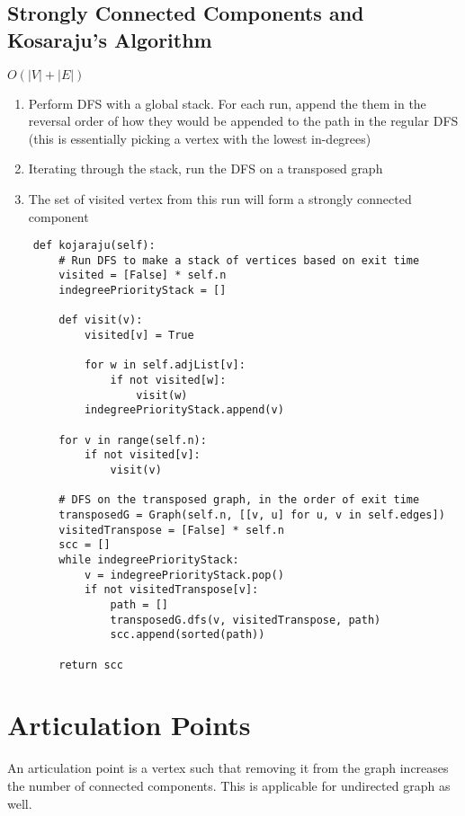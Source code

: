 \subsection{Strongly Connected Components and Kosaraju's Algorithm}

$O(|V| + |E|)$

\begin{enumerate}
  \item Perform DFS with a global stack. For each run, append the them in the reversal order of how they would be appended to the path in the regular DFS (this is essentially picking a vertex with the lowest in-degrees)
  \item Iterating through the stack, run the DFS on a transposed graph
  \item The set of visited vertex from this run will form a strongly connected component
\end{enumerate}

\begin{verbatim}
    def kojaraju(self):
        # Run DFS to make a stack of vertices based on exit time
        visited = [False] * self.n
        indegreePriorityStack = []

        def visit(v):
            visited[v] = True

            for w in self.adjList[v]:
                if not visited[w]:
                    visit(w)
            indegreePriorityStack.append(v)

        for v in range(self.n):
            if not visited[v]:
                visit(v)

        # DFS on the transposed graph, in the order of exit time
        transposedG = Graph(self.n, [[v, u] for u, v in self.edges])
        visitedTranspose = [False] * self.n
        scc = []
        while indegreePriorityStack:
            v = indegreePriorityStack.pop()
            if not visitedTranspose[v]:
                path = []
                transposedG.dfs(v, visitedTranspose, path)
                scc.append(sorted(path))

        return scc
\end{verbatim}

\section{Articulation Points}

An articulation point is a vertex such that removing it from the graph increases the number of connected components.
This is applicable for undirected graph as well.

